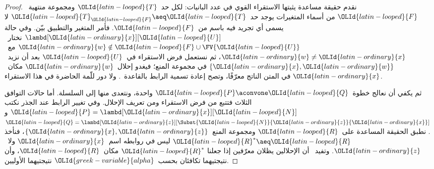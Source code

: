 \documentclass[../../../include/open-logic-section]{subfiles}
\begin{document}
\begin{proof}
  نقدم حقيقة مساعدة يثبتها الاستقراء القوي في عدد البانيات: لكل حد~$\OLId{latin-looped}{T}$
  ومجموعة منتهية~$\OLId{latin-looped}{F}$ من أسماء المتغيرات يوجد حد~$\OLId{latin-looped}{T}_\OLId{latin-looped}{F}\aeq \OLId{latin-looped}{T}$ لا يسمى أي
  تجريد فيه باسم من~$\OLId{latin-looped}{F}$. فأمر المتغير والتطبيق بيّن. وفي حالة
  $\lambd[\OLId{latin-ordinary}{x}][\OLId{latin-looped}{U}]$ نختار~$\OLId{latin-ordinary}{w}\notin \OLId{latin-looped}{F}\cup\FV{\OLId{latin-looped}{U}}$ مع~$\OLId{latin-ordinary}{w}\ne \OLId{latin-ordinary}{x}$، ثم نستعمل
  فرض الاستقراء في~$\OLId{latin-looped}{U}$ بعد أن نزيد~$\{\OLId{latin-ordinary}{x},\OLId{latin-ordinary}{w}\}$ في مجموعة المنع؛ فيغدو
  إحلال~$\OLId{latin-ordinary}{w}$ مكان~$\OLId{latin-ordinary}{x}$ في المتن الناتج معرّفًا، وتصح إعادة تسمية الرابط
  بالقاعدة~. ولا دور للّمة الحاضرة في هذا
  الاستقراء.

  ثم يكفي أن نعالج خطوة~$\OLId{latin-looped}{P}\aconvone \OLId{latin-looped}{Q}$ واحدة، ونتعدى منها إلى السلسلة.
  أما حالات التوافق الثلاث فتتبع من فرض الاستقراء ومن تعريف الإحلال.
  وفي تغيير الرابط عند الجذر نكتب
  $\OLId{latin-looped}{P}=\lambd[\OLId{latin-ordinary}{x}][\OLId{latin-looped}{N}]$ و$\OLId{latin-looped}{Q}=\lambd[\OLId{latin-ordinary}{z}][\Subst{\OLId{latin-looped}{N}}{\OLId{latin-ordinary}{z}}{\OLId{latin-ordinary}{x}}]$.
  نطبق الحقيقة المساعدة على~$\OLId{latin-looped}{R}$ ومجموعة المنع~$\{\OLId{latin-ordinary}{x},\OLId{latin-ordinary}{z}\}$، فنأخذ
  $\OLId{latin-looped}{R}^\ast\aeq \OLId{latin-looped}{R}$ ليس في روابطه اسم~$\OLId{latin-ordinary}{x}$ ولا~$\OLId{latin-ordinary}{z}$.
  وتفيد~ أن الإحلالين يظلان معرّفين إذا جعلنا
  $\OLId{latin-looped}{R}^\ast$ مكان~$\OLId{latin-looped}{R}$، وأن نتيجتيهما تكافئان بحسب~$\OLId{greek-variable}{alpha}$ نتيجتيهما
  الأوليين.


\end{proof}
\end{document}
